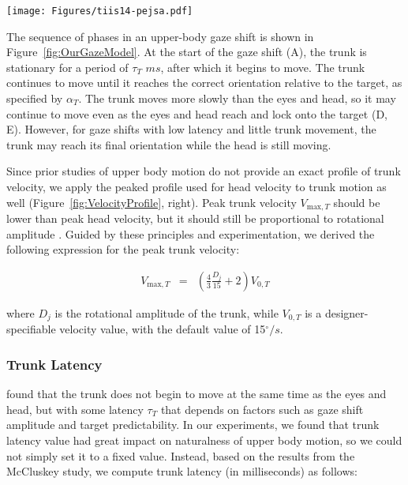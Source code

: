 \begin{figure*}
\centering
\texttt{[image: Figures/tiis14-pejsa.pdf]}
\caption{Movement phases of the eyes, head, and trunk in a gaze shift. Dashed area indicates that the trunk may stop moving before or after the head.}
\label{fig:OurGazeModel}
\end{figure*}

The sequence of phases in an upper-body gaze shift is shown in Figure~\ref{fig:OurGazeModel}. At the start of the gaze shift (A), the trunk is stationary for a period of $\tau_T$ $ms$, after which it begins to move. The trunk continues to move until it reaches the correct orientation relative to the target, as specified by $\alpha_T$. The trunk moves more slowly than the eyes and head, so it may continue to move even as the eyes and head reach and lock onto the target (D, E). However, for gaze shifts with low latency and little trunk movement, the trunk may reach its final orientation while the head is still moving.

Since prior studies of upper body motion do not provide an exact profile of trunk velocity, we apply the peaked profile used for head velocity to trunk motion as well (Figure~\ref{fig:VelocityProfile}, right). Peak trunk velocity $V_{\mathrm{max},T}$ should be lower than peak head velocity, but it should still be proportional to rotational amplitude \cite{mccluskey2007monkeys}. Guided by these principles and experimentation, we derived the following expression for the peak trunk velocity:

\begin{eqnarray} \label{eq:TrunkVmax}
V_{\mathrm{max},T} &=& (\frac{4}{3} \frac{D_j}{15} + 2) V_{0,T}
\end{eqnarray}

where $D_j$ is the rotational amplitude of the trunk, while $V_{0,T}$ is a designer-specifiable velocity value, with the default value of 15$^{\circ}/s$.

\subsubsection{Trunk Latency}

\citet{mccluskey2007monkeys} found that the trunk does not begin to move at the same time as the eyes and head, but with some latency $\tau_T$ that depends on factors such as gaze shift amplitude and target predictability. In our experiments, we found that trunk latency value had great impact on naturalness of upper body motion, so we could not simply set it to a fixed value. Instead, based on the results from the McCluskey study, we compute trunk latency (in milliseconds) as follows:

